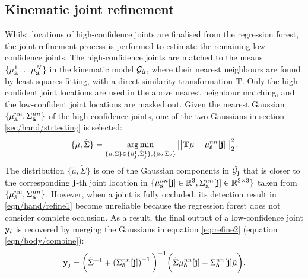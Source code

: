 \subsection{Kinematic joint refinement} 
\label{sec/hand/kjr} 

Whilst locations of high-confidence joints are finalised from the regression forest, the joint refinement process is performed to estimate the remaining low-confidence joints. 
The high-confidence joints are matched to the means $\{\mu_{\hat{\mathbf{a}}}^{1}\dots\mu_{\hat{\mathbf{a}}}^{N}\}$ in the kinematic model $\mathcal{G}_{\hat{\mathbf{a}}}$, where their nearest neighbours are found by least squares fitting, with a direct similarity transformation $\mathbf{T}$.  
Only the high-confident joint locations are used in the above nearest neighbour matching, and the low-confident joint locations are masked out. 
Given the nearest Gaussian $\{\mu_{\hat{\mathbf{a}}}^{nn}, \Sigma_{\hat{\mathbf{a}}}^{nn}\}$ of the high-confidence joints, one of the two Gaussians in section \ref{sec/hand/strtesting} is selected: 
\begin{equation}
		\{\tilde{\mu}, \tilde{\Sigma}\} 
		= \operatorname*{arg\,min}_{\{\mu, \Sigma\} \in \{\hat{\mu}_{\mathbf{j}}^{1}, \hat{\Sigma}_{\mathbf{j}}^{1}\},  \{\hat{\mu}_{2}\, \hat{\Sigma}_{2}\}}  
		\big|\big|\mathbf{T}\mu - \mu_{\hat{\mathbf{a}}}^{nn}[\mathbf{j}]\big|\big|^2_2.
		\label{eqn/hand/refine1}
\end{equation}
The distribution $\{\tilde{\mu}, \tilde{\Sigma}\}$ is one of the Gaussian components in $\hat{\mathcal{G}}_{\mathbf{j}}$ that is closer to the corresponding $\mathbf{j}$-th joint location in $\{\mu_{\hat{\mathbf{a}}}^{nn}[\mathbf{j}] \in \mathbb{R}^{3}, \Sigma_{\hat{\mathbf{a}}}^{nn}[\mathbf{j}] \in \mathbb{R}^{3\times3}\}$ taken from $\{ \mu_{\hat{\mathbf{a}}}^{nn}, \Sigma_{\hat{\mathbf{a}}}^{nn} \} $. However, when a joint is fully occluded, its detection result in \ref{eqn/hand/refine1} become unreliable because the regression forest does not consider complete occlusion.   
As a result, the final output of a low-confidence joint $\mathbf{y}_{l}$ is recovered by merging the Gaussians in equation \ref{eq:refine2} (\cf equation \ref{eqn/body/combine}): 
\begin{equation}
	\mathbf{y}_{\mathbf{j}} =
	\bigg(\tilde{\Sigma}^{-1} + \left(\Sigma_{\hat{\mathbf{a}}}^{nn}[\mathbf{j}]\right)^{-1}\bigg)^{-1}  \bigg( \tilde{\Sigma} \mu_{\hat{\mathbf{a}}}^{nn}[\mathbf{j}] + \Sigma_{\hat{\mathbf{a}}}^{nn}[\mathbf{j}]\tilde{\mu}\bigg).
	\label{eq:refine2}
\end{equation}

